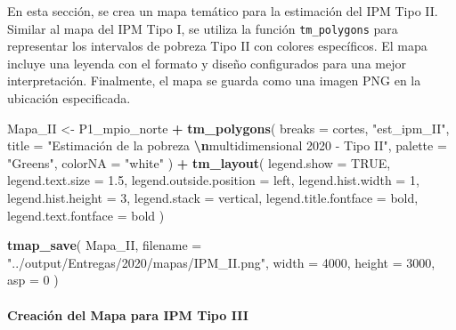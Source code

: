\documentclass[
  12pt,
]{book}
\newenvironment{Shaded}{\begin{snugshade}}{\end{snugshade}}
\newcommand{\AttributeTok}[1]{\textcolor[rgb]{0.13,0.29,0.53}{#1}}
\newcommand{\ConstantTok}[1]{\textcolor[rgb]{0.56,0.35,0.01}{#1}}
\newcommand{\DecValTok}[1]{\textcolor[rgb]{0.00,0.00,0.81}{#1}}
\newcommand{\FloatTok}[1]{\textcolor[rgb]{0.00,0.00,0.81}{#1}}
\newcommand{\FunctionTok}[1]{\textcolor[rgb]{0.13,0.29,0.53}{\textbf{#1}}}
\newcommand{\NormalTok}[1]{#1}
\newcommand{\OtherTok}[1]{\textcolor[rgb]{0.56,0.35,0.01}{#1}}
\newcommand{\SpecialCharTok}[1]{\textcolor[rgb]{0.81,0.36,0.00}{\textbf{#1}}}
\newcommand{\StringTok}[1]{\textcolor[rgb]{0.31,0.60,0.02}{#1}}
\begin{document}
En esta sección, se crea un mapa temático para la estimación del IPM Tipo II. Similar al mapa del IPM Tipo I, se utiliza la función \texttt{tm\_polygons} para representar los intervalos de pobreza Tipo II con colores específicos. El mapa incluye una leyenda con el formato y diseño configurados para una mejor interpretación. Finalmente, el mapa se guarda como una imagen PNG en la ubicación especificada.

\begin{Shaded}
\begin{Highlighting}[]
\NormalTok{Mapa\_II }\OtherTok{\textless{}{-}}
\NormalTok{  P1\_mpio\_norte }\SpecialCharTok{+} \FunctionTok{tm\_polygons}\NormalTok{(}
    \AttributeTok{breaks =}\NormalTok{ cortes,}
    \StringTok{"est\_ipm\_II"}\NormalTok{,}
    \AttributeTok{title =} \StringTok{"Estimación de la pobreza }\SpecialCharTok{\textbackslash{}n}\StringTok{multidimensional 2020 {-} Tipo II"}\NormalTok{,}
    \AttributeTok{palette =} \StringTok{"Greens"}\NormalTok{,}
    \AttributeTok{colorNA =} \StringTok{"white"}
\NormalTok{  ) }\SpecialCharTok{+} \FunctionTok{tm\_layout}\NormalTok{(}
    \AttributeTok{legend.show =} \ConstantTok{TRUE}\NormalTok{,}
    \AttributeTok{legend.text.size =} \FloatTok{1.5}\NormalTok{,}
    \AttributeTok{legend.outside.position =} \StringTok{\textquotesingle{}left\textquotesingle{}}\NormalTok{,}
    \AttributeTok{legend.hist.width =} \DecValTok{1}\NormalTok{,}
    \AttributeTok{legend.hist.height =} \DecValTok{3}\NormalTok{,}
    \AttributeTok{legend.stack =} \StringTok{\textquotesingle{}vertical\textquotesingle{}}\NormalTok{,}
    \AttributeTok{legend.title.fontface =} \StringTok{\textquotesingle{}bold\textquotesingle{}}\NormalTok{,}
    \AttributeTok{legend.text.fontface =} \StringTok{\textquotesingle{}bold\textquotesingle{}}
\NormalTok{  )}

\FunctionTok{tmap\_save}\NormalTok{(}
\NormalTok{  Mapa\_II,}
  \AttributeTok{filename =} \StringTok{"../output/Entregas/2020/mapas/IPM\_II.png"}\NormalTok{,}
  \AttributeTok{width =} \DecValTok{4000}\NormalTok{,}
  \AttributeTok{height =} \DecValTok{3000}\NormalTok{,}
  \AttributeTok{asp =} \DecValTok{0}
\NormalTok{)}
\end{Highlighting}
\end{Shaded}

\hypertarget{creaciuxf3n-del-mapa-para-ipm-tipo-iii}{%
\paragraph*{Creación del Mapa para IPM Tipo III}\label{creaciuxf3n-del-mapa-para-ipm-tipo-iii}}
\end{document}
